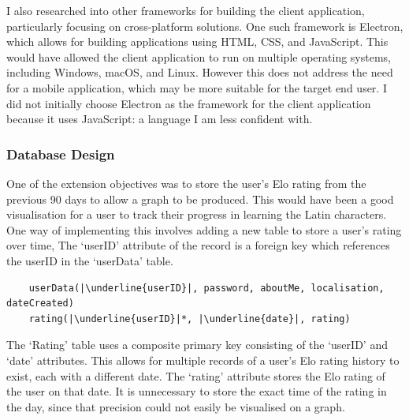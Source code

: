 \documentclass{article}
\begin{document}
I also researched into other frameworks for building the client application, particularly focusing on cross-platform solutions. One such framework is Electron, which allows for building applications using HTML, CSS, and JavaScript. This would have allowed the client application to run on multiple operating systems, including Windows, macOS, and Linux. However this does not address the need for a mobile application, which may be more suitable for the target end user. I did not initially choose Electron as the framework for the client application because it uses JavaScript: a language I am less confident with.

\subsubsection{Database Design}

One of the extension objectives was to store the user's Elo rating from the previous 90 days to allow a graph to be produced. This would have been a good visualisation for a user to track their progress in learning the Latin characters. One way of implementing this involves adding a new table to store a user's rating over time, The `userID' attribute of the record is a foreign key which references the userID in the `userData' table.

\begin{verbatim}
	userData(|\underline{userID}|, password, aboutMe, localisation, dateCreated)
	rating(|\underline{userID}|*, |\underline{date}|, rating)
\end{verbatim}

 The `Rating' table uses a composite primary key consisting of the `userID' and `date' attributes. This allows for multiple records of a user's Elo rating history to exist, each with a different date. The `rating' attribute stores the Elo rating of the user on that date. It is unnecessary to store the exact time of the rating in the day, since that precision could not easily be visualised on a graph. \\
\end{document}
